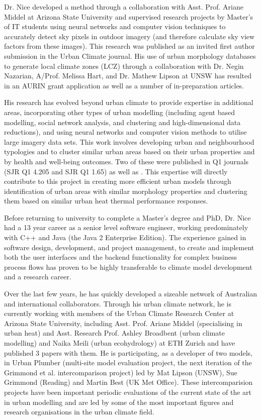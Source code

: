 Dr. Nice developed a method through a collaboration with Asst. Prof. Ariane Middel at Arizona State University and supervised research projects by Master's of IT students using neural networks and computer vision techniques to accurately detect sky pixels in outdoor imagery (and therefore calculate sky view factors from these images). This research was published as an invited first author submission\cite{Nice2020} in the Urban Climate journal. His use of urban morphology databases to generate local climate zones (LCZ) through a collaboration with Dr. Negin Nazarian, A/Prof. Melissa Hart, and Dr. Mathew Lipson at UNSW has resulted in an AURIN grant application as well as a number of in-preparation articles.

His research has evolved beyond urban climate to provide expertise in additional areas, incorporating other types of urban modelling (including agent based modelling, social network analysis, and clustering and high-dimensional data reductions), and using neural networks and computer vision methods to utilise large imagery data sets. This work involves developing urban and neighbourhood typologies and to cluster similar urban areas based on their urban properties and by health and well-being outcomes. Two of these were published in Q1 journals\cite{Thompson2020,Wijnands2019} (SJR Q1 4.205 and SJR Q1 1.65) as well as \cite{Nice2020a}. This expertise will directly contribute to this project in creating more efficient urban models through identification of urban areas with similar morphology properties and clustering them based on similar urban heat thermal performance responses.

Before returning to university to complete a Master's degree and PhD, Dr. Nice had a 13 year career as a senior level software engineer, working predominately with C++ and Java (the Java 2 Enterprise Edition). The experience gained in software design, development, and project management, to create and implement both the user interfaces and the backend functionality for complex business process flows has proven to be highly transferable to climate model development and a research career. 

Over the last few years, he has quickly developed a sizeable network of Australian and international collaborators. Through his urban climate network, he is currently working with members of the Urban Climate Research Center at Arizona State University, including Asst. Prof. Ariane Middel (specialising in urban heat) and Asst. Research Prof. Ashley Broadbent (urban climate modelling) and Naika Meili (urban ecohydrology) at ETH Zurich and have published 3 papers with them. He is participating, as a developer of two models, in Urban Plumber (multi-site model evaluation project, the next iteration of the Grimmond et al.\cite{Grimmond2011} intercomparison project) led by Mat Lipson (UNSW), Sue Grimmond (Reading) and Martin Best (UK Met Office). These intercomparision projects have been important periodic evaluations of the current state of the art in urban modelling and are led by some of the most important figures and research organisations in the urban climate field. 

